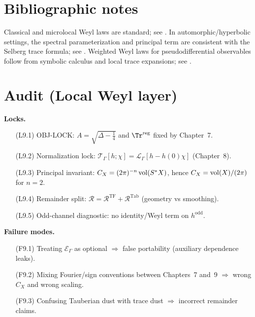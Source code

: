 \section{Bibliographic notes}\label{sec:09.bib-notes}

Classical and microlocal Weyl laws are standard; see \cite{HormanderI,Sogge2014,Zworski2012}.
In automorphic/hyperbolic settings, the spectral parameterization and principal term are consistent with the Selberg trace formula;
see \cite{Hejhal1983,Buser1992,Iwaniec2002,Borthwick2016}.
Weighted Weyl laws for pseudodifferential observables follow from symbolic calculus and local trace expansions; see
\cite{DuistermaatGuillemin1975,Ivrii1998,DyatlovZworski2019}.


\section*{Audit (Local Weyl layer)}\label{sec:09.audit}

\noindent\textbf{Locks.}
\begin{itemize}
\item[(L9.1)] OBJ-LOCK: $A=\sqrt{\Delta-\tfrac14}$ and $\Tr^{\mathrm{reg}}$ fixed by Chapter~7.
\item[(L9.2)] Normalization lock: $\mathcal T_\Gamma[h;\chi]=\mathcal L_\Gamma[h-h(0)\chi]$ (Chapter~8).
\item[(L9.3)] Principal invariant: $C_X=(2\pi)^{-n}\mathop{\mathrm{vol}}\nolimits(S^*X)$, hence $C_X=\mathop{\mathrm{vol}}\nolimits(X)/(2\pi)$ for $n=2$.
\item[(L9.4)] Remainder split: $\mathcal R=\mathcal R^{\mathrm{TF}}+\mathcal R^{\mathrm{Tab}}$ (geometry vs smoothing).
\item[(L9.5)] Odd-channel diagnostic: no identity/Weyl term on $h^{\mathrm{odd}}$.
\end{itemize}

\medskip
\noindent\textbf{Failure modes.}
\begin{itemize}
\item[(F9.1)] Treating $\mathcal E_\Gamma$ as optional $\Rightarrow$ false portability (auxiliary dependence leaks).
\item[(F9.2)] Mixing Fourier/sign conventions between Chapters~7 and~9 $\Rightarrow$ wrong $C_X$ and wrong scaling.
\item[(F9.3)] Confusing Tauberian dust with trace dust $\Rightarrow$ incorrect remainder claims.
\end{itemize}

